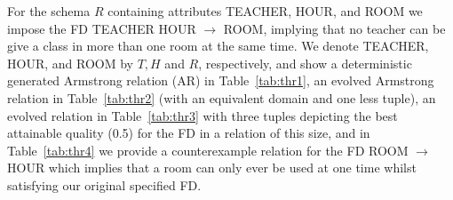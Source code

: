 \begin{example}
\begin{rm}
For the schema $R$ containing attributes TEACHER, HOUR, and ROOM
we impose the FD TEACHER HOUR $\to$ ROOM, implying that no teacher
can be give a class in more than one room at the same time.
 We denote TEACHER, HOUR, and ROOM by $T, H$ and $R$,
 respectively, and show a deterministic
generated Armstrong relation (AR) in Table~\ref{tab:thr1}, an evolved 
Armstrong relation in Table~\ref{tab:thr2} (with an equivalent domain and one
less tuple), an evolved relation in Table~\ref{tab:thr3} with three
tuples depicting the best attainable quality (0.5) for the FD in a relation
of this size, and in Table~\ref{tab:thr4} we provide a counterexample
relation for the FD ROOM $\to$ HOUR which implies that a room can only ever be 
used at one time whilst satisfying our original specified FD.
\end{rm}
\end{example}


